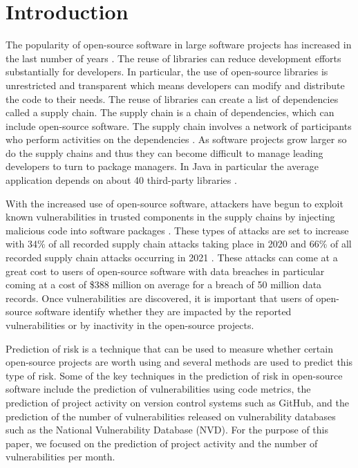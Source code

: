 \documentclass[10pt, compsoc, conference]{IEEEtran}
\begin{document}
\section{Introduction}
The popularity of open-source software in large software projects has increased in the last number of years \cite{zajdel_open_2022}. The reuse of libraries can reduce development efforts substantially for developers. In particular, the use of open-source libraries is unrestricted and transparent which means developers can modify and distribute the code to their needs. The reuse of libraries can create a list of dependencies called a supply chain. The supply chain is a chain of dependencies, which can include open-source software. The supply chain involves a network of participants who perform activities on the dependencies \cite{k_singi_trusted_2019}. As software projects grow larger so do the supply chains and thus they can become difficult to manage leading developers to turn to package managers. In Java in particular the average application depends on about 40 third-party libraries \cite{a_m_mir_effect_2023}. 

With the increased use of open-source software, attackers have begun to exploit known vulnerabilities in trusted components in the supply chains by injecting malicious code into software packages \cite{ohm_backstabbers_2020}. These types of attacks are set to increase with 34\% of all recorded supply chain attacks taking place in 2020 and 66\% of all recorded supply chain attacks occurring in 2021 \cite{m_z_malik_protection_2023}. These attacks can come at a great cost to users of open-source software with data breaches in particular coming at a cost of \$388 million on average for a breach of 50 million data records\cite{x_wang_feasibility_2021}. Once vulnerabilities are discovered, it is important that users of open-source software identify whether they are impacted by the reported vulnerabilities or by inactivity in the open-source projects. 

Prediction of risk is a technique that can be used to measure whether certain open-source projects are worth using and several methods are used to predict this type of risk. Some of the key techniques in the prediction of risk in open-source software include the prediction of vulnerabilities using code metrics, the prediction of project activity on version control systems such as GitHub, and the prediction of the number of vulnerabilities released on vulnerability databases such as the National Vulnerability Database (NVD). For the purpose of this paper, we focused on the prediction of project activity and the number of vulnerabilities per month. 
\end{document}
